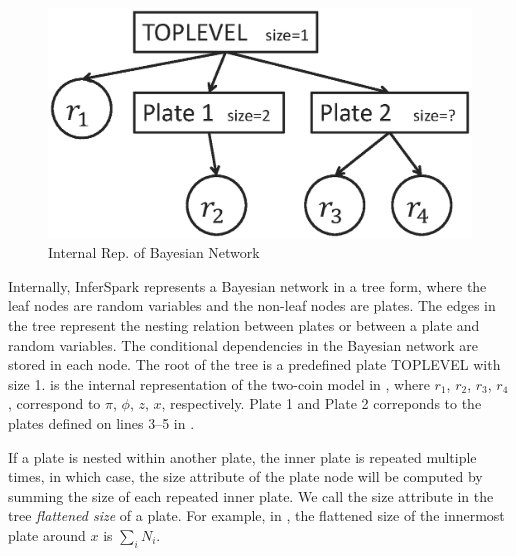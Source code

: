 \begin{figure}[ht]
\centering
	\includegraphics[width=0.6\columnwidth]{figs/two_coins_internal_bn1.eps}
	\caption{Internal Rep. of Bayesian Network}
	\label{fig:two_coins_internal_bn1}
\end{figure}

Internally, InferSpark represents a Bayesian network in a tree form, where the
leaf nodes are random variables and the non-leaf nodes are plates. The edges
in the tree represent the nesting relation between plates or between a plate
and random variables. The conditional dependencies in the Bayesian network are
stored in each node.  The root of the tree is a predefined plate TOPLEVEL with
size 1.   is the internal representation of
the two-coin model in , where
$r_1$, $r_2$, $r_3$, $r_4$, correspond to $\pi$, $\phi$, $z$, $x$, respectively. 
Plate 1 and Plate 2 correponds to the plates defined on lines 3--5 in
. 

If a plate is nested within another plate,
the inner plate is repeated multiple times, in which case,
the size attribute of the plate node will be computed by summing the size of each
repeated inner plate. We call the size attribute in the tree {\em flattened size}
of a plate. For example, in , the flattened
size of the innermost plate around $x$ is $\sum_i N_i$.

